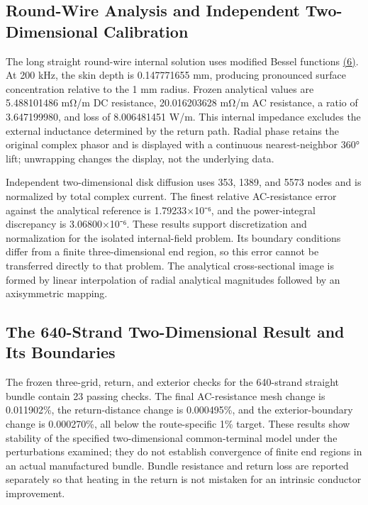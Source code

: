 \documentclass[11pt]{article}
\begin{document}
\subsection*{Round-Wire Analysis and Independent Two-Dimensional Calibration}
\hypertarget{03.analytic.heading}{}
The long straight round-wire internal solution uses modified Bessel functions \href{paper_en_single.pdf#E03}{(6)}. At 200 kHz, the skin depth is 0.147771655 mm, producing pronounced surface concentration relative to the 1 mm radius. Frozen analytical values are 5.488101486 mΩ/m DC resistance, 20.016203628 mΩ/m AC resistance, a ratio of 3.647199980, and loss of 8.006481451 W/m. This internal impedance excludes the external inductance determined by the return path. Radial phase retains the original complex phasor and is displayed with a continuous nearest-neighbor 360° lift; unwrapping changes the display, not the underlying data.


Independent two-dimensional disk diffusion uses 353, 1389, and 5573 nodes and is normalized by total complex current. The finest relative AC-resistance error against the analytical reference is 1.79233×10⁻⁶, and the power-integral discrepancy is 3.06800×10⁻⁶. These results support discretization and normalization for the isolated internal-field problem. Its boundary conditions differ from a finite three-dimensional end region, so this error cannot be transferred directly to that problem. The analytical cross-sectional image is formed by linear interpolation of radial analytical magnitudes followed by an axisymmetric mapping.


\subsection*{The 640-Strand Two-Dimensional Result and Its Boundaries}
\hypertarget{03.coax_results.heading}{}
The frozen three-grid, return, and exterior checks for the 640-strand straight bundle contain 23 passing checks. The final AC-resistance mesh change is 0.011902\%, the return-distance change is 0.000495\%, and the exterior-boundary change is 0.000270\%, all below the route-specific 1\% target. These results show stability of the specified two-dimensional common-terminal model under the perturbations examined; they do not establish convergence of finite end regions in an actual manufactured bundle. Bundle resistance and return loss are reported separately so that heating in the return is not mistaken for an intrinsic conductor improvement.
\end{document}
